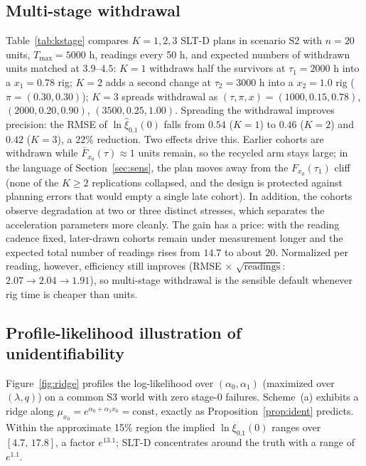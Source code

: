 \documentclass[11pt]{article}
\newcommand{\tmax}{T_{\max}}
\newcommand{\SLTD}{SLT-D}
\begin{document}
\subsection{Multi-stage withdrawal}\label{sec:simk}

Table~\ref{tab:kstage} compares $K=1,2,3$ \SLTD{} plans in scenario S2 with $n=20$ units,
$\tmax=5000$ h, readings every 50 h, and expected numbers of withdrawn units matched at
$3.9$--$4.5$: $K{=}1$ withdraws half the survivors at $\tau_1=2000$ h into a $x_1=0.78$ rig;
$K{=}2$ adds a second change at $\tau_2=3000$ h into a $x_2=1.0$ rig ($\pi=(0.30,0.30)$);
$K{=}3$ spreads withdrawal as $(\tau,\pi,x)=(1000,0.15,0.78)$, $(2000,0.20,0.90)$,
$(3500,0.25,1.00)$. Spreading the withdrawal improves precision: the RMSE of
$\ln\hat\xi_{0.1}(0)$ falls from $0.54$ ($K{=}1$) to $0.46$ ($K{=}2$) and $0.42$ ($K{=}3$),
a $22\%$ reduction. Two effects drive this. Earlier cohorts are withdrawn while
$\bar F_{x_0}(\tau)\approx1$ units remain, so the recycled arm stays large; in the language
of Section~\ref{sec:sens}, the plan moves away from the $F_{x_0}(\tau_1)$ cliff (none of the
$K{\ge}2$ replications collapsed, and the design is protected against planning errors that
would empty a single late cohort). In addition, the cohorts observe degradation at two or
three distinct stresses, which separates the acceleration parameters more cleanly. The gain
has a price: with the reading cadence fixed, later-drawn cohorts remain under measurement
longer and the expected total number of readings rises from $14.7$ to about $20$. Normalized
per reading, however, efficiency still improves
(RMSE$\,\times\,\sqrt{\text{readings}}$: $2.07\to2.04\to1.91$), so multi-stage withdrawal
is the sensible default whenever rig time is cheaper than units.

\begin{table}[t]
\centering\footnotesize
\caption{Multi-stage \SLTD{} in scenario S2 (500 replications): plans matched in units
($n=20$) and expected withdrawals; $\ln\hat\xi_{0.1}(0)$ errors; $r$ = number of readings
per replication.}
\label{tab:kstage}

\end{table}

\subsection{Profile-likelihood illustration of unidentifiability}

Figure~\ref{fig:ridge} profiles the log-likelihood over $(\alpha_0,\alpha_1)$ (maximized over
$(\lambda,q)$) on a common S3 world with zero stage-0 failures. Scheme~(a) exhibits a ridge
along $\mu_{x_0}=e^{\alpha_0+\alpha_1x_0}=\mathrm{const}$, exactly as
Proposition~\ref{prop:ident} predicts. Within the approximate 15\% region the implied
$\ln\xi_{0.1}(0)$ ranges over $[4.7,\,17.8]$, a factor $e^{13.1}$; \SLTD{} concentrates
around the truth with a range of $e^{1.1}$.
\end{document}
